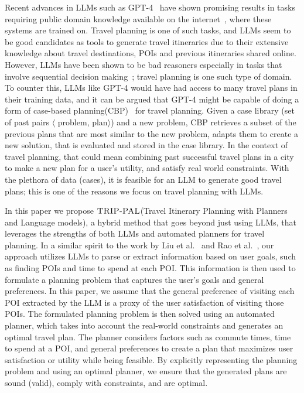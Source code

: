 \documentclass[letterpaper]{article}
\newcommand{\gpt}{{\sc GPT-4}\xspace}
\newcommand{\approach}{\ensuremath{\textsc{TRIP-PAL}}\xspace}
\begin{document}
Recent advances in LLMs such as \gpt~\cite{gpt4_tech_report} have shown promising results in tasks requiring public domain knowledge available on the internet~\cite{suri2024use_llm_knowledge_tasks,gpt4_tech_report}, where these systems are trained on.
Travel planning is one of such tasks, and LLMs seem to be good candidates as tools to generate travel itineraries due to their extensive knowledge about travel destinations, POIs and previous itineraries shared online.
However, LLMs have been shown to be bad reasoners especially in tasks that involve sequential decision making~\cite{rao_cannot_plan}; travel planning is one such type of domain. To counter this, LLMs like \gpt would have had access to many travel plans in their training data, and it can be argued that \gpt might be capable of doing a form of case-based planning(CBP)~\cite{case_based_planning_survey} for travel planning. Given a case library (set of past pairs $\langle$ problem, plan$\rangle$) and a new problem, CBP retrieves a subset of the previous plans that are most similar to the new problem, adapts them to create a new solution, that is evaluated and stored in the case library. In the context of travel planning, that could mean combining past successful travel plans in a city to make a new plan for a user's utility, and satisfy real world constraints. With the plethora of data (cases), it is feasible for an LLM to generate good travel plans; this is one of the reasons we focus on travel planning with LLMs.


In this paper we propose \approach (Travel Itinerary Planning with Planners and Language models), a hybrid method that goes beyond just using LLMs, that leverages the strengths of both LLMs and automated planners for travel planning. In a similar spirit to the work by Liu et al.~\cite{liu2023llm+} and Rao et al.~\cite{LLM_modul_plan_Rao}, our approach utilizes LLMs to parse or extract information based on user goals, such as finding POIs and time to spend at each POI. This information is then used to formulate a planning problem that captures the user's goals and general preferences. In this paper, we assume that the general preference of visiting each POI extracted by the LLM is a proxy of the user satisfaction of visiting those POIs. The formulated planning problem is then solved using an automated planner, which takes into account the real-world constraints and generates an optimal travel plan. The planner considers factors such as commute times, time to spend at a POI, and general preferences to create a plan that maximizes user satisfaction or utility while being feasible. By explicitly representing the planning problem and using an optimal planner, we ensure that the generated plans are sound (valid), comply with constraints, and are optimal. 
\end{document}
